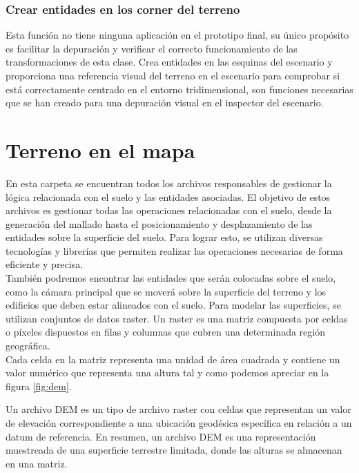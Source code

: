 \documentclass[a4paper, 11pt]{book}
\begin{document}
\subsubsection{Crear entidades en los corner del terreno}
\label{funcion:createCorner}
Esta función no tiene ninguna aplicación en el prototipo final, su único propósito es facilitar la depuración y verificar el correcto funcionamiento de las transformaciones de esta clase. Crea entidades en las esquinas del escenario y proporciona una referencia visual del terreno en el escenario para comprobar si está correctamente centrado en el entorno tridimensional, son funciones necesarias que se han creado para una depuración visual en el inspector del escenario.
\clearpage
\section{Terreno en el mapa}
\label{sec:mapGround}
En esta carpeta se encuentran todos los archivos responsables de gestionar la lógica relacionada con el suelo y las entidades asociadas. El objetivo de estos archivos es gestionar todas las operaciones relacionadas con el suelo, desde la generación del mallado hasta el posicionamiento y desplazamiento de las entidades sobre la superficie del suelo. Para lograr esto, se utilizan diversas tecnologías y librerías que permiten realizar las operaciones necesarias de forma eficiente y precisa.\\
También podremos encontrar las entidades que serán colocadas sobre el suelo, como la cámara principal que se moverá sobre la superficie del terreno y los edificios que deben estar alineados con el suelo. Para modelar las superficies, se utilizan conjuntos de datos raster. Un raster es una matriz compuesta por celdas o píxeles dispuestos en filas y columnas que cubren una determinada región geográfica.\\
Cada celda en la matriz representa una unidad de área cuadrada y contiene un valor numérico que representa una altura tal y como podemos apreciar en la figura \ref{fig:dem}.

Un archivo DEM es un tipo de archivo raster con celdas que representan un valor de elevación correspondiente a una ubicación geodésica específica en relación a un datum de referencia. En resumen, un archivo DEM es una representación muestreada de una superficie terrestre limitada, donde las alturas se almacenan en una matriz.
\end{document}
